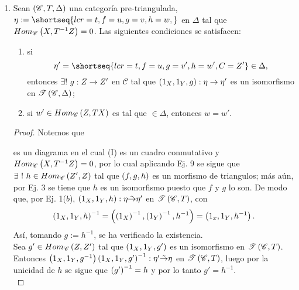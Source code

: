 \documentclass{article}
\begin{document}
\begin{enumerate}[label=\textbf{Ej \arabic*.}]
\begin{proof}
		\end{proof}
		\item Sean $\left(\mathscr{C},T,\Delta\right)$ una categoría pre-triangulada, $\eta:=\shortseq{lcr=t,f=u,g=v,h=w,}$ en $\Delta$ tal que $Hom_{\mathscr{C}}\left(X,T^{-1}Z\right)=0$. Las siguientes condiciones se satisfacen:
		\begin{enumerate}[label=(\textit{\alph*})]
			\item si \begin{equation*}
				\eta'=\shortseq{lcr=t,f=u,g=v',h=w',C=Z'}\in\Delta,
			\end{equation*}
		 entonces $\exists !\ \catarrow{g}{Z}{Z'}{}$ en $\mathscr{C}$ tal que $\catarrow{\lrprth{1_X,1_Y,g}}{\eta}{\eta'}{}$ es un isomorfismo en $\mathscr{T}\left(\mathscr{C},\Delta\right)$;
			\item si $w'\in Hom_{\mathscr{C}}\left(Z,TX\right)$ es tal que $\in\Delta$, entonces $w=w'$.
		\end{enumerate}
		\begin{proof}
			 Notemos que 
			\begin{center}
			\end{center}
		es un diagrama en el cual (I) es un cuadro conmutativo y $Hom_{\mathscr{C}}\left(X,T^{-1}Z\right)=0$, por lo cual aplicando Ej. 9 se sigue que $\exists\ !\ h\in\ringmodhom{\mathscr{C}}{Z'}{Z}$ tal que $\left(f,g,h\right)$ es un morfismo de triangulos; más aún, por Ej. 3 se tiene que $h$ es un isomorfismo puesto que $f$ y $g$ lo son. De modo que, por Ej. 1($b$), $\catarrow{\lrprth{1_X,1_Y,h}}{\eta}{\eta'}{i}$ en $\mathscr{T}\left(\mathscr{C}, T\right)$,  con
		\begin{equation*}
			\left(1_X,1_Y,h\right)^{-1}=\left(\left(1_X\right)^{-1},\left(1_Y\right)^{-1},{h}^{-1}\right)=\left(1_x,1_Y,h^{-1}\right).
		\end{equation*}
		Así, tomando $g:=h^{-1}$, se ha verificado la existencia.\\
		
		Sea $g'\in Hom_{\mathscr{C}}\left(Z,Z'\right)$ tal que $\left(1_X,1_Y,g'\right)$ es un isomorfismo en $\mathscr{T}\left(\mathscr{C}, T\right)$. Entonces $\catarrow{\lrprth{1_X,1_Y,g^{-1}}\lrprth{1_X,1_Y,g'}^{-1}}{\eta'}{\eta}{i}$ en $\mathscr{T}\left(\mathscr{C}, T\right)$, luego por la unicidad de $h$ se sigue que $\left(g'\right)^{-1}=h$ y por lo tanto $g'=h^{-1}$.\\
		

\end{proof}
\end{enumerate}
\end{document}
